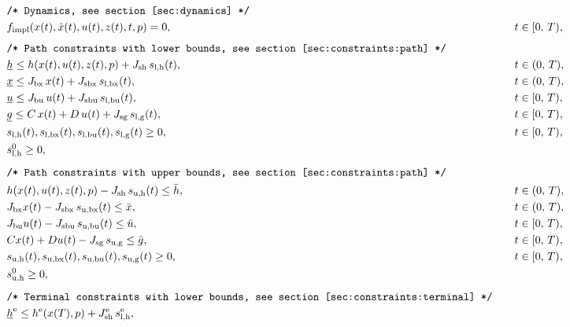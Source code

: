 \documentclass[english]{article}
\newcommand{\ind}[1]{_{\textrm{#1}}}
\newcommand{\terminal}{^{\textrm{e}}}
\newcommand{\initial}{^{\textrm{0}}}
\newcommand{\lowerh}{\ind{l,h}}
\newcommand{\lowerbx}{\ind{l,bx}}
\newcommand{\lowerbu}{\ind{l,bu}}
\newcommand{\lowerg}{\ind{l,g}}
\newcommand{\upperh}{\ind{u,h}}
\newcommand{\upperbx}{\ind{u,bx}}
\newcommand{\upperbu}{\ind{u,bu}}
\newcommand{\upperg}{\ind{u,g}}
\newcommand{\mathComment}[1]{\texttt{/* #1 */}}
\begin{document}
\begin{align}
    &&&\mathComment{Dynamics, see section \ref{sec:dynamics}}\nonumber\\
    &&& f\ind{impl}(x(t), \dot{x}(t), u(t), z(t), t, p) = 0, &&\quad t \in [0,\,T), \label{eq:dynamics}\\[1ex]
    &&&\mathComment{Path constraints with lower bounds, see section \ref{sec:constraints:path}}\nonumber\\
    &&&\underline{h} \leq h(x(t), u(t), z(t), p) + J_{\textrm{sh}} \, s\lowerh(t), &&\quad t \in (0,\,T),\\
    &&&\underline{x} \leq J_{\textrm{bx}} \, x(t) + J_{\textrm{sbx}} \,s\lowerbx(t), &&\quad t \in (0,\,T),\\
    &&&\underline{u} \leq J_{\textrm{bu}} \,u(t) + J_{\textrm{sbu}} \,s\lowerbu(t), &&\quad t \in [0,\,T),\\
    &&&\underline{g} \leq C\,x(t) + D\,u(t) + J_{\textrm{sg}} \,s\lowerg(t), &&\quad t \in [0,\,T), \\
    &&& s\lowerh (t), s\lowerbx(t), s\lowerbu(t), s\lowerg(t) \geq 0, &&\quad t \in [0,\,T), \\
    &&& s\lowerh\initial \geq 0, && \label{eq:constraints:path:lower_bounds:end}\\[1ex]
    &&&\mathComment{Path constraints with upper bounds, see section \ref{sec:constraints:path}}\nonumber\\
    &&& h(x(t), u(t), z(t), p) - J_{\textrm{sh}} \, s\upperh(t) \leq \bar{h}, &&\quad t \in (0,\,T),\\
    &&& J_{\textrm{bx}} x(t) - J_{\textrm{sbx}}\, s\upperbx(t) \leq \bar{x}, &&\quad t \in (0,\,T),\\
    &&& J_{\textrm{bu}} u(t) - J_{\textrm{sbu}}\, s\upperbu(t)\leq \bar{u}, &&\quad t \in [0,\,T),\\
    &&& Cx(t) + Du(t) - J_{\textrm{sg}}\, s\upperg \leq \bar{g}, &&\quad t \in [0,\,T), \\
    &&& s\upperh(t), s\upperbx(t), s\upperbu(t), s\upperg(t) \geq 0, &&\quad t \in [0,\,T), \\
    &&& s\ind{u,h}\initial \geq 0, && \label{eq:constraints:path:upper_bounds:end}\\[1ex]
    &&&\mathComment{Terminal constraints with lower bounds, see section \ref{sec:constraints:terminal}}\nonumber\\
    &&&\underline{h}\terminal \leq h\terminal(x(T), p) + J\ind{sh}\terminal\, s\lowerh\terminal, &&\label{eq:constraints:terminal:lower_bounds:start}\\

\end{align}
\end{document}
